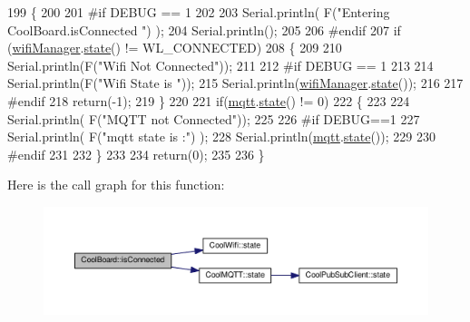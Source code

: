 \begin{DoxyCode}
199 \{
200 
201 \textcolor{preprocessor}{#if DEBUG == 1  }
202 
203     Serial.println( F(\textcolor{stringliteral}{"Entering CoolBoard.isConnected "}) );
204     Serial.println();
205 
206 \textcolor{preprocessor}{#endif}
207     \textcolor{keywordflow}{if} (\hyperlink{class_cool_board_acd88e6003606b47479ebba81e4aceeca}{wifiManager}.\hyperlink{class_cool_wifi_a1c7b4d82a4098d346e7593dce92039fa}{state}() != WL\_CONNECTED)
208     \{
209     
210         Serial.println(F(\textcolor{stringliteral}{"Wifi Not Connected"}));
211 
212 \textcolor{preprocessor}{    #if DEBUG == 1}
213 
214         Serial.println(F(\textcolor{stringliteral}{"Wifi State is "}));
215         Serial.println(\hyperlink{class_cool_board_acd88e6003606b47479ebba81e4aceeca}{wifiManager}.\hyperlink{class_cool_wifi_a1c7b4d82a4098d346e7593dce92039fa}{state}());
216         
217 \textcolor{preprocessor}{    #endif}
218         \textcolor{keywordflow}{return}(-1);
219     \}
220     
221     \textcolor{keywordflow}{if}(\hyperlink{class_cool_board_a2399f44d7c23c1149a335cb3b46d90f1}{mqtt}.\hyperlink{class_cool_m_q_t_t_a5d003307eff78efbd585e42b43b72b6d}{state}() != 0)
222     \{
223         
224         Serial.println( F(\textcolor{stringliteral}{"MQTT not Connected"}));
225 
226 \textcolor{preprocessor}{    #if DEBUG==1}
227         Serial.println( F(\textcolor{stringliteral}{"mqtt state is :"}) );
228         Serial.println(\hyperlink{class_cool_board_a2399f44d7c23c1149a335cb3b46d90f1}{mqtt}.\hyperlink{class_cool_m_q_t_t_a5d003307eff78efbd585e42b43b72b6d}{state}());  
229     
230 \textcolor{preprocessor}{    #endif}
231 
232     \}
233     
234     \textcolor{keywordflow}{return}(0);
235 
236 \}
\end{DoxyCode}
Here is the call graph for this function\+:\nopagebreak
\begin{figure}[H]
\begin{center}
\leavevmode
\includegraphics[width=350pt]{d7/df9/class_cool_board_ad7442cf4b62c7b0d5bd62a0f75ffc065_cgraph}
\end{center}
\end{figure}
\mbox{\label{class_cool_board_ae6b5e1274d760462290192acea4adca8}} 
